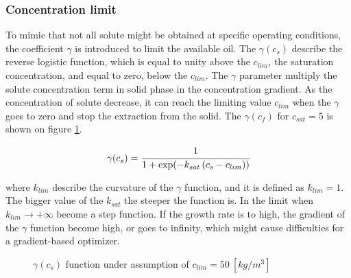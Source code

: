 \documentclass[../Article_Model_Parameters.tex]{subfiles}
\begin{document}
	
	\subsubsection{Concentration limit}
	
	To mimic that not all solute might be obtained at specific operating conditions, the coefficient $\gamma$ is introduced to limit the available oil. The $\gamma(c_s)$ describe the reverse logistic function, which is equal to unity above the $c_{lim}$, the saturation concentration, and equal to zero, below the $c_{lim}$. The $\gamma$ parameter multiply the solute concentration term in solid phase in the concentration gradient. As the concentration of solute decrease, it can reach the limiting value $c_{lim}$ when the $\gamma$ goes to zero and stop the extraction from the solid.
	The $\gamma(c_f)$ for $c_{sat}=5$ is shown on figure \ref{fig: Gamma_function}.
			
	{\footnotesize
		\begin{equation}
			\gamma(c_s) = \cfrac{1}{1+\exp ( -k_{sat} \left( c_s - c_{lim} \right) ) }
			\label{EQ: C_sat_function}
			\end{equation}
	}
			
	where $k_{lim}$ describe the curvature of the $\gamma$ function, and it is defined as $k_{lim} = 1$. The bigger value of the $k_{sat}$ the steeper the function is. In the limit when $ k_{lim}\rightarrow+\infty$ become a step function. If the growth rate is to high, the gradient of the $\gamma$ function become high, or goes to infinity, which might cause difficulties for a gradient-based optimizer.
			
	\begin{figure}[h!]
		\centering
			\caption{$\gamma(c_s)$ function under assumption of $c_{lim}=50~[kg/m^3]$}
			\label{fig: Gamma_function}
	\end{figure}
			
\end{document}
